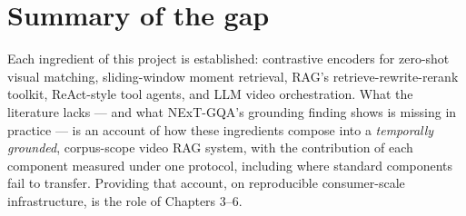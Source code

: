 \section{Summary of the gap}

Each ingredient of this project is established: contrastive encoders for
zero-shot visual matching, sliding-window moment retrieval, RAG's
retrieve-rewrite-rerank toolkit, ReAct-style tool agents, and LLM video
orchestration. What the literature lacks --- and what NExT-GQA's
grounding finding \autocite{xiao2024nextgqa} shows is missing in
practice --- is an account of how these ingredients compose into a
\emph{temporally grounded}, corpus-scope video RAG system, with the
contribution of each component measured under one protocol, including
where standard components fail to transfer. Providing that account, on
reproducible consumer-scale infrastructure, is the role of Chapters
3--6.
